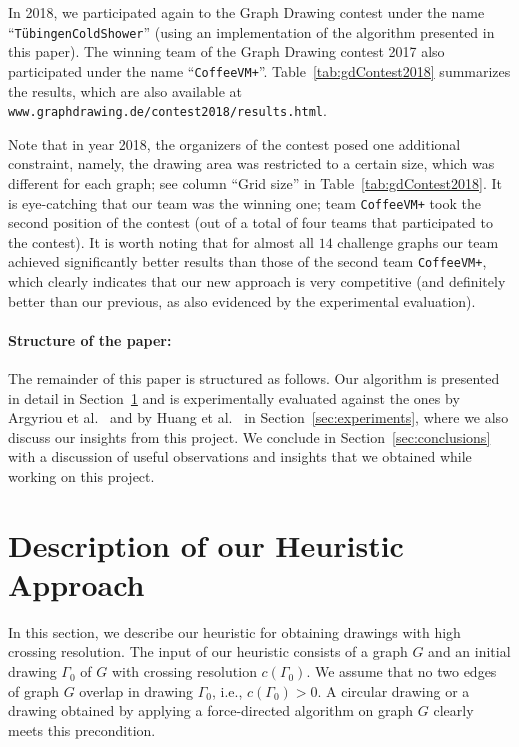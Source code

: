 \documentclass{comjnl}
\newcommand{\myparagraph}[1]{\medskip\noindent\textbf{#1}.}
\begin{document}
In 2018, we participated again to the Graph Drawing contest under the name ``\texttt{T\"ubingenColdShower}'' (using an implementation of the algorithm presented in this paper). The winning team of the Graph Drawing contest 2017 also participated under the name ``\texttt{CoffeeVM+}''. Table~\ref{tab:gdContest2018} summarizes the results, which are also available at \texttt{www.graphdrawing.de/contest2018/results.html}. 

Note that in year 2018, the organizers of the contest posed one additional constraint, namely, the drawing area was restricted to a certain size, which was different for each graph; see column ``Grid size'' in Table~\ref{tab:gdContest2018}. It is eye-catching that our team was the winning one; team \texttt{CoffeeVM+} took the second position of the contest (out of a total of four teams that participated to the contest). It is worth noting that for almost all $14$ challenge graphs our team achieved significantly better results than those of the second team \texttt{CoffeeVM+}, which clearly indicates that our new approach is very competitive (and definitely better than our previous,  as also evidenced by the experimental evaluation).

\paragraph{Structure of the paper:}
The remainder of this paper is structured as follows. 
Our algorithm is presented in detail in Section~\ref{sec:algorithm} and is experimentally evaluated against the ones by Argyriou et al.~\cite{DBLP:journals/cj/ArgyriouBS13} and by Huang et al.~\cite{DBLP:journals/vlc/HuangEHL13} in Section~\ref{sec:experiments}, where we also discuss our insights from this project. We conclude in Section~\ref{sec:conclusions} with a discussion of useful observations and insights that we obtained while working on this project.

\section{Description of our Heuristic Approach}
\label{sec:algorithm}

In this section, we describe our heuristic for obtaining drawings with high crossing resolution. The input of our heuristic consists of a graph $G$ and an initial drawing $\Gamma_0$ of $G$ with crossing resolution $c(\Gamma_0)$. We assume that no two edges of graph $G$ overlap in drawing $\Gamma_0$, i.e., $c(\Gamma_0)>0$. A circular drawing or a drawing obtained by applying a force-directed algorithm on graph $G$ clearly meets this precondition.
\end{document}
